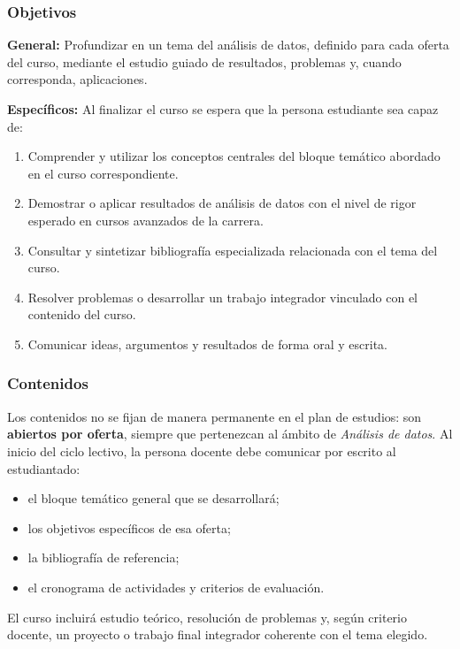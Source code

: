 \begin{refsection}
\subsubsection*{Objetivos}

\textbf{General:} Profundizar en un tema del análisis de datos, definido para cada oferta del curso, mediante el estudio guiado de resultados, problemas y, cuando corresponda, aplicaciones.

\textbf{Específicos:} Al finalizar el curso se espera que la persona estudiante sea capaz de:

\begin{enumerate}
\item Comprender y utilizar los conceptos centrales del bloque temático abordado en el curso correspondiente.
\item Demostrar o aplicar resultados de análisis de datos con el nivel de rigor esperado en cursos avanzados de la carrera.
\item Consultar y sintetizar bibliografía especializada relacionada con el tema del curso.
\item Resolver problemas o desarrollar un trabajo integrador vinculado con el contenido del curso.
\item Comunicar ideas, argumentos y resultados de forma oral y escrita.
\end{enumerate}

\subsubsection*{Contenidos}

Los contenidos no se fijan de manera permanente en el plan de estudios: son \textbf{abiertos por oferta}, siempre que pertenezcan al ámbito de \emph{Análisis de datos}. Al inicio del ciclo lectivo, la persona docente debe comunicar por escrito al estudiantado:

\begin{itemize}
\item el bloque temático general que se desarrollará;
\item los objetivos específicos de esa oferta;
\item la bibliografía de referencia;
\item el cronograma de actividades y criterios de evaluación.
\end{itemize}

El curso incluirá estudio teórico, resolución de problemas y, según criterio docente, un proyecto o trabajo final integrador coherente con el tema elegido.


\end{refsection}
